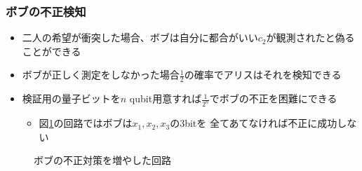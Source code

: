 \begin{frame}
  \frametitle{ボブの不正検知}

  \pause
  \begin{itemize}
    \item<+-> 二人の希望が衝突した場合、ボブは自分に都合がいい$c_2$が観測されたと偽ることができる

    \item<+-> ボブが正しく測定をしなかった場合$\frac{1}{2}$の確率でアリスはそれを検知できる

    \item<+-> 検証用の量子ビットを$n$ qubit用意すれば$\frac{1}{2^n}$でボブの不正を困難にできる
    \begin{itemize}
      \item 図\ref{fig:bob_cheat_detection}の回路ではボブは$x_1, x_2, x_3$の3bitを
      全てあてなければ不正に成功しない
    \end{itemize}
  \end{itemize}

  \begin{figure}
    \caption{ボブの不正対策を増やした回路}
    \label{fig:bob_cheat_detection}
  \end{figure}
\end{frame}


